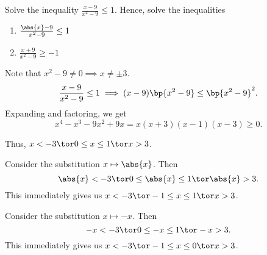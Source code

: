 \begin{problem}
    Solve the inequality $\frac{x-9}{x^2-9} \leq 1$. Hence, solve the inequalities

    \begin{enumerate}
        \item $\frac{\abs{x}-9}{x^2-9} \leq 1$
        \item $\frac{x+9}{x^2-9} \geq -1$
    \end{enumerate}
\end{problem}
\begin{solution}
    Note that $x^2 - 9 \neq 0 \implies x \neq \pm 3$.
    \[\frac{x-9}{x^2-9} \leq 1 \implies (x-9)\bp{x^2-9} \leq \bp{x^2 - 9}^2.\] Expanding and factoring, we get \[x^4 - x^3 - 9x^2 + 9x = x(x+3)(x-1)(x-3) \geq 0.\]

    \begin{center}
    \end{center}
    Thus, $x < -3 \tor 0 \leq x \leq 1 \tor x > 3$.

    \begin{ppart}
        Consider the substitution $x \mapsto \abs{x}$. Then \[\abs{x} < -3 \tor 0 \leq \abs{x} \leq 1 \tor \abs{x} > 3.\] This immediately gives us $x < -3 \tor -1 \leq x \leq 1 \tor x > 3$.
    \end{ppart}
    \begin{ppart}
        Consider the substitution $x \mapsto -x$. Then \[-x < -3 \tor 0 \leq -x \leq 1 \tor -x > 3.\] This immediately gives us $x < -3 \tor -1 \leq x \leq 0 \tor x > 3$.
    \end{ppart}
\end{solution}

